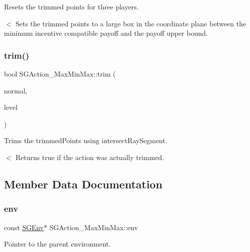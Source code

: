 Resets the trimmed points for three players. 

$<$ Sets the trimmed points to a large box in the coordinate plane between the minimum incentive compatible payoff and the payoff upper bound. \mbox{\label{classSGAction__MaxMinMax_a15466a06d5b9bdce97eaa20f9fa94371}} 
\subsubsection{\texorpdfstring{trim()}{trim()}}
{\footnotesize\ttfamily bool S\+G\+Action\+\_\+\+Max\+Min\+Max\+::trim (\begin{DoxyParamCaption}\item[{const \hyperlink{classSGPoint}{S\+G\+Point} \&}]{normal,  }\item[{double}]{level }\end{DoxyParamCaption})}



Trims the trimmed\+Points using intersect\+Ray\+Segment. 

$<$ Returns true if the action was actually trimmed. 

\subsection{Member Data Documentation}
\mbox{\label{classSGAction__MaxMinMax_a02879e7551a4d8f89d4dece73df79e8e}} 
\subsubsection{\texorpdfstring{env}{env}}
{\footnotesize\ttfamily const \hyperlink{classSGEnv}{S\+G\+Env}$\ast$ S\+G\+Action\+\_\+\+Max\+Min\+Max\+::env\hspace{0.3cm}{\ttfamily [private]}}

Pointer to the parent environment. \mbox{\label{classSGAction__MaxMinMax_a775fcd57afc142655d881205242b05b6}} 
